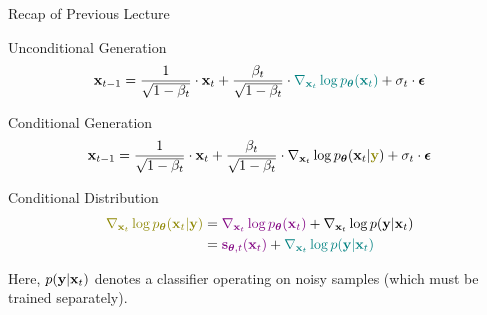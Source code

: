 \documentclass{beamer}
\begin{document}
\begin{frame}{Recap of Previous Lecture}
	\begin{block}{Unconditional Generation}
		\vspace{-0.3cm}
		\[
			\mathbf{x}_{t - 1} = \frac{1}{\sqrt{1 - \beta_t}} \cdot \mathbf{x}_t + \frac{\beta_t}{\sqrt{1 - \beta_t}} \cdot {\color{teal} \nabla_{\mathbf{x}_t} \log p_{\boldsymbol{\theta}}(\mathbf{x}_t)} +  \sigma_t \cdot \boldsymbol{\epsilon}
		\]
		\vspace{-0.5cm}
	\end{block}
	\begin{block}{Conditional Generation}
		\vspace{-0.5cm}
		\[
			\bx_{t - 1} =  \frac{1}{\sqrt{1 - \beta_t}}\cdot \bx_t +  \frac{\beta_t}{\sqrt{1 - \beta_t}}  \cdot  \nabla_{\bx_t} \log \pt(\bx_t | {\color{olive}\by}) +  \sigma_t \cdot \bepsilon
		\]
		\vspace{-0.5cm}
	\end{block}
	\begin{block}{Conditional Distribution}
		\vspace{-0.5cm}
		\begin{align*}
			{\color{olive}\nabla_{\bx_t} \log \pt(\bx_t | \by)} &
			= {\color{violet}\nabla_{\bx_t} \log \pt(\bx_t)} + \nabla_{\bx_t} \log p(\by | \bx_t) \\
			&= {\color{violet} \bs_{\btheta, t}(\bx_t)} + {\color{teal}\nabla_{\bx_t} \log p(\by | \bx_t)}
		\end{align*}
		\vspace{-0.5cm}
	\end{block}
	Here, $p(\mathbf{y} | \mathbf{x}_t)$ denotes a classifier operating on noisy samples (which must be trained separately).
\end{frame}
\end{document}
